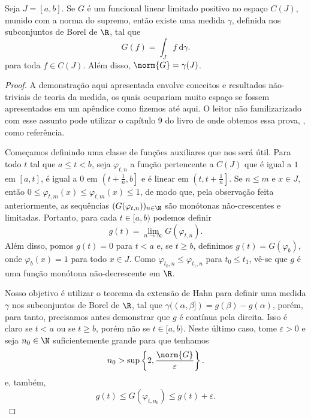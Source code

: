 \begin{teo}
    Seja \( J = [a, b] \).
    Se \( G \) é um funcional linear limitado positivo no espaço \( C(J) \), munido com a norma do supremo, então existe uma medida \( \gamma \), definida nos subconjuntos de Borel de \( \R \), tal que
    \begin{equation}
        G(f) = \int_{ J } f \ \mathrm{d}\gamma
        \label{eq: representation}
    .\end{equation}
    para toda \( f \in C(J) \).
    Além disso, \( \norm{ G } = \gamma(J) \).
\end{teo}
\begin{proof}
    A demonstração aqui apresentada envolve conceitos e resultados não-triviais de teoria da medida, os quais ocupariam muito espaço se fossem apresentados em um apêndice como fizemos até aqui.
    O leitor não familizarizado com esse assunto pode utilizar o capítulo 9 do livro de onde obtemos essa prova, \cite{bartle}, como referência.

    Começamos definindo uma classe de funções auxiliares que nos será útil.
    Para todo \( t \) tal que \( a \leq t < b \), seja \( \varphi_{ t,n } \) a função pertencente a \( C(J) \) que é igual a \( 1 \) em \( [a, t] \), é igual a \( 0 \) em \( \left(t+ \frac{ 1 }{ n }, b\right] \) e é linear em \( \left(t, t + \frac{ 1 }{ n }\right] \).
    Se \( n \leq m \) e \( x \in J \), então \( 0 \leq \varphi_{ t, m }(x) \leq \varphi_{ t, m }(x) \leq 1 \), de modo que, pela observação feita anteriormente, as sequências \( (G(\varphi_{ t, n }))_{ n\in\N } \) são monótonas não-crescentes e limitadas.
    Portanto, para cada \( t \in [a, b) \) podemos definir \[
        g(t) = \lim_{ n\to\infty } G(\varphi_{ t,n })
    .\]
    Além disso, pomos \( g(t) = 0 \) para \( t < a \) e, se \( t \geq b \), definimos \( g(t) = G(\varphi_{ b }) \), onde \( \varphi_{ b }(x) = 1 \) para todo \( x \in J \).
    Como \( \varphi_{ t_{ 0 }, n } \leq \varphi_{ t_{ 1 }, n } \) para \( t_{ 0 } \leq t_{ 1 } \), vê-se que \( g \) é uma função monótona não-decrescente em \( \R \).

    Nosso objetivo é utilizar o teorema da extensão de Hahn para definir uma medida \( \gamma \) nos subconjuntos de Borel de \( \R \), tal que \( \gamma((\alpha, \beta]) = g(\beta) - g(\alpha) \), porém, para tanto, precisamos antes demonstrar que \( g \) é contínua pela direita.
    Isso é claro se \( t < a \) ou se \( t \geq b \), porém não se \( t \in [a, b) \).
    Neste último caso, tome \( \varepsilon > 0 \) e seja \( n_{ 0 } \in \N \) suficientemente grande para que tenhamos
    \begin{equation}
        n_{ 0 } > \sup \left\{ 2, \frac{ \norm{ G } }{ \varepsilon } \right\}
        \label{eq: n0}
    .\end{equation}
    e, também,
    \begin{equation}
        g(t) \leq G(\varphi_{ t, n_{ 0 } }) \leq g(t) + \varepsilon
        \label{eq: g_sandwich}
    .\end{equation}


\end{proof}
